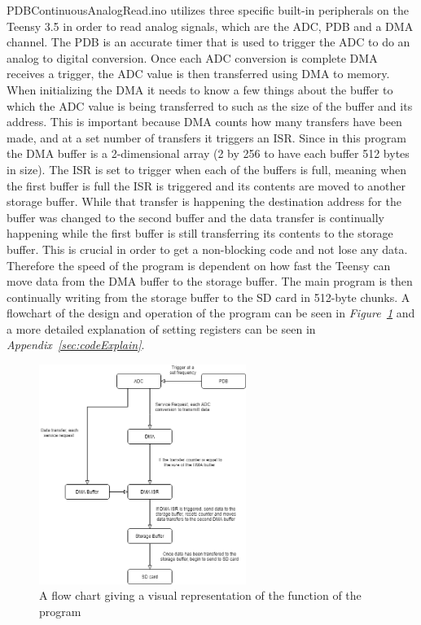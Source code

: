 PDBContinuousAnalogRead.ino utilizes three specific built-in peripherals on the Teensy 3.5 in order to read analog signals, which are the ADC, PDB and a DMA channel.
The PDB is an accurate timer that is used to trigger the ADC to do an analog to digital conversion.
Once each ADC conversion is complete DMA receives a trigger, the ADC value is then transferred using DMA to memory.
When initializing the DMA it needs to know a few things about the buffer to which the ADC value is being transferred to such as the size of the buffer and its address. 
This is important because DMA counts how many transfers have been made, and at a set number of transfers it triggers an ISR.
Since in this program the DMA buffer is a 2-dimensional array (2 by 256 to have each buffer 512 bytes in size).
The ISR is set to trigger when each of the buffers is full, meaning when the first buffer is full the ISR is triggered and its contents are moved to another storage buffer.
While that transfer is happening the destination address for the buffer was changed to the second buffer and the data transfer is continually happening while the first buffer is still transferring its contents to the storage buffer.
This is crucial in order to get a non-blocking code and not lose any data.
Therefore the speed of the program is dependent on how fast the Teensy can move data from the DMA buffer to the storage buffer.
The main program is then continually writing from the storage buffer to the SD card in 512-byte chunks.
A flowchart of the design and operation of the program can be seen in \textit{Figure~\ref{fig:CodeFlow}} and a more detailed explanation of setting registers can be seen in \textit{Appendix~\ref{sec:codeExplain}}.

\begin{figure}[h]
    \centering
    \includegraphics[width=0.60\textwidth]{graphics/flowChart.png}
    \caption{A flow chart giving a visual representation of the function of the program}
    \label{fig:CodeFlow}
\end{figure}

